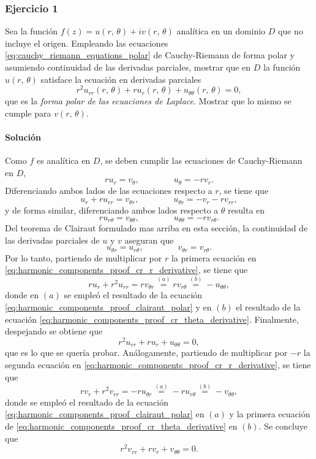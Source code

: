 \documentclass[a4paper]{report}
\begin{document}
\subsubsection{Ejercicio 1}

Sea la función \(f(z)=u(r,\,\theta)+iv(r,\,\theta)\) analítica en un dominio \(D\) que no incluye el origen. Empleando las ecuaciones \ref{eq:cauchy_riemann_equations_polar} de Cauchy-Riemann de forma polar y asumiendo continuidad de las derivadas parciales, mostrar que en \(D\) la función \(u(r,\,\theta)\) satisface la ecuación en derivadas parciales
\[
 r^2u_{rr}(r,\,\theta)+ru_r(r,\,\theta)+u_{\theta\theta}(r,\,\theta)=0,
\]
que es la \emph{forma polar de las ecuaciones de Laplace}. Mostrar que lo mismo se cumple para \(v(r,\,\theta)\).

\paragraph{Solución} Como \(f\) es analítica en \(D\), se deben cumplir las ecuaciones de Cauchy-Riemann en \(D\),
\[
 ru_r=v_\theta, 
 \qquad\qquad
 u_\theta=-rv_r.
\]
Diferenciando ambos lados de las ecuaciones respecto a \(r\), se tiene que 
\begin{equation}\label{eq:harmonic_components_proof_cr_r_derivative}
 u_r+ru_{rr}=v_{\theta r},
 \qquad\qquad
 u_{\theta r}=-v_r-rv_{rr},
\end{equation}
y de forma similar, diferenciando ambos lados respecto a \(\theta\) resulta en
\begin{equation}\label{eq:harmonic_components_proof_cr_theta_derivative}
 ru_{r\theta}=v_{\theta\theta}, 
 \qquad\qquad
 u_{\theta\theta}=-rv_{r\theta}. 
\end{equation}
Del teorema de Clairaut formulado mas arriba en esta sección, la continuidad de las derivadas parciales de \(u\) y \(v\) aseguran que
\begin{equation}\label{eq:harmonic_components_proof_clairaut_polar}
 u_{\theta r}=u_{r\theta},
 \qquad\qquad
 v_{\theta r}=v_{r\theta}.
\end{equation}
Por lo tanto, partiendo de multiplicar por \(r\) la primera ecuación en \ref{eq:harmonic_components_proof_cr_r_derivative}, se tiene que 
\[
 ru_r+r^2u_{rr}=rv_{\theta r}\overset{(a)}{=}rv_{r\theta}\overset{(b)}{=}-u_{\theta\theta},
\]
donde en \((a)\) se empleó el resultado de la ecuación \ref{eq:harmonic_components_proof_clairaut_polar} y en \((b)\) el resultado de la ecuación \ref{eq:harmonic_components_proof_cr_theta_derivative}. Finalmente, despejando se obtiene que 
\[
 r^2u_{rr}+ru_r+u_{\theta\theta}=0,
\]
que es lo que se quería probar. Análogamente, partiendo de multiplicar por \(-r\) la segunda ecuación en \ref{eq:harmonic_components_proof_cr_r_derivative}, se tiene que 
\[
 rv_r+r^2v_{rr}=-ru_{\theta r}\overset{(a)}{=}-ru_{r\theta}\overset{(b)}{=}-v_{\theta\theta},
\]
donde se empleó el resultado de la ecuación \ref{eq:harmonic_components_proof_clairaut_polar} en \((a)\) y la primera ecuación de \ref{eq:harmonic_components_proof_cr_theta_derivative} en \((b)\). Se concluye que 
\[
 r^2v_{rr}+rv_r+v_{\theta\theta}=0.
\]
\end{document}
